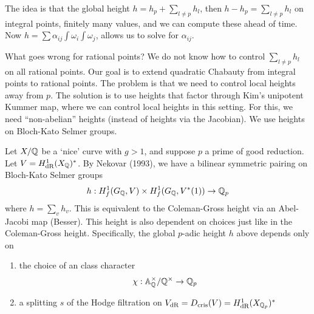 The idea is that the global height $h= h_p + \sum_{l \neq p} h_l$, then $h - h_p= \sum_{l \neq p} h_l$ on integral points, finitely many values, and we can compute these ahead of time. Now $h= \sum \alpha_{ij} \int \omega_i \int \omega_j$, allows us to solve for $\alpha_{ij}$. 


What goes wrong for rational points? We do not know how to control $\sum_{l \neq p} h_l$ on all rational points. Our goal is to extend quadratic Chabauty from integral points to rational points. The problem is that we need to control local heights away from $p$. The solution is to use heights that factor through Kim's unipotent Kummer map, where we can control local heights in this setting. For this, we need ``non-abelian'' heights (instead of heights via the Jacobian). We use heights on Bloch-Kato Selmer groups.


Let $X/\mathbb{Q}$ be a `nice' curve with $g>1$, and suppose $p$ a prime of good reduction. Let $V= H^1_{\text{dR}}(X_{\mathbb{Q}})^*$. By Nekovar (1993), we have a bilinear symmetric pairing on Bloch-Kato Selmer groups
	\[
	h: H_f^1(G_{\mathbb{Q}}, V) \times H_f^1(G_{\mathbb{Q}}, V^*(1)) \to \mathbb{Q}_p
	\]
where $h= \sum_v h_v$. This is equivalent to the Coleman-Gross height via an \etale Abel-Jacobi map (Besser). This height is also dependent on choices just like in the Coleman-Gross height. Specifically, the global $p$-adic height $h$ above depends only on


\begin{enumerate}[1.]
\item the choice of an \idele class character
	\[
	\chi: \mathbb{A}_{\mathbb{Q}}^\times/\mathbb{Q}^\times \to \mathbb{Q}_p
	\]

\item a splitting $s$ of the Hodge filtration on $V_{\text{dR}}= D_{\text{cris}}(V)= H_{\text{dR}}^1(X_{\mathbb{Q}_p})^*$
\end{enumerate}


